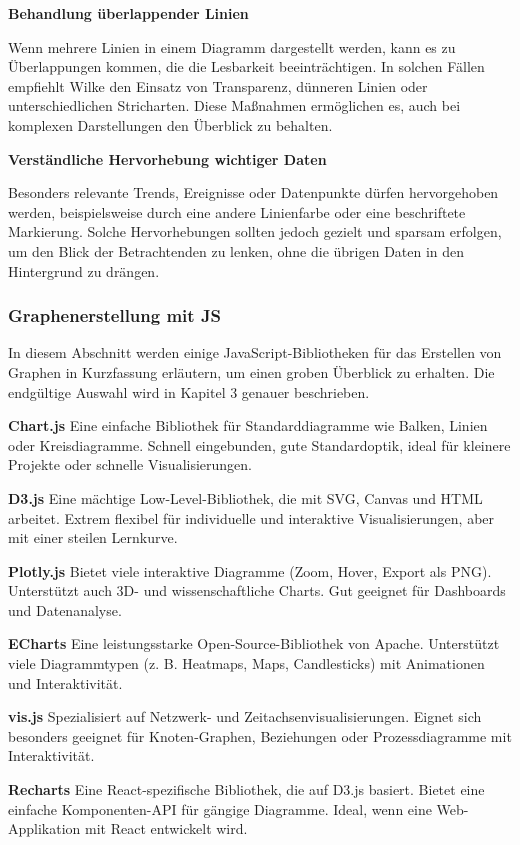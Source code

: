 \item
\textbf{Behandlung überlappender Linien}

Wenn mehrere Linien in einem Diagramm dargestellt werden, kann es zu Überlappungen kommen, die die Lesbarkeit beeinträchtigen.
In solchen Fällen empfiehlt Wilke den Einsatz von Transparenz, dünneren Linien oder unterschiedlichen Stricharten.
Diese Maßnahmen ermöglichen es, auch bei komplexen Darstellungen den Überblick zu behalten.
\item
\textbf{Verständliche Hervorhebung wichtiger Daten}

Besonders relevante Trends, Ereignisse oder Datenpunkte dürfen hervorgehoben werden, beispielsweise durch eine andere Linienfarbe oder eine beschriftete Markierung.
Solche Hervorhebungen sollten jedoch gezielt und sparsam erfolgen, um den Blick der Betrachtenden zu lenken, ohne die übrigen Daten in den Hintergrund zu drängen.

\subsubsection{Graphenerstellung mit JS}

In diesem Abschnitt werden einige JavaScript-Bibliotheken für das Erstellen von Graphen
in Kurzfassung erläutern, um einen groben Überblick zu erhalten.
Die endgültige Auswahl wird in Kapitel 3 genauer beschrieben.

\textbf{Chart.js}
Eine einfache Bibliothek für Standarddiagramme wie Balken, Linien
oder Kreisdiagramme. Schnell eingebunden, gute Standardoptik, ideal für
kleinere Projekte oder schnelle Visualisierungen. \cite{Chartjs2025}

\textbf{D3.js}
Eine mächtige Low-Level-Bibliothek, die mit \ac{SVG}, Canvas und HTML arbeitet.
Extrem flexibel für individuelle und interaktive Visualisierungen, aber mit
einer steilen Lernkurve. \cite{D3js2025}

\textbf{Plotly.js}
Bietet viele interaktive Diagramme (Zoom, Hover, Export als PNG). Unterstützt
auch 3D- und wissenschaftliche Charts. Gut geeignet für Dashboards und
Datenanalyse. \cite{Plotlyjs2025}

\textbf{ECharts}
Eine leistungsstarke Open-Source-Bibliothek von Apache. Unterstützt viele
Diagrammtypen (z. B. Heatmaps, Maps, Candlesticks) mit Animationen und
Interaktivität. \cite{ECharts2025}

\textbf{vis.js}
Spezialisiert auf Netzwerk- und Zeitachsenvisualisierungen. Eignet sich
besonders geeignet für Knoten-Graphen, Beziehungen oder Prozessdiagramme mit Interaktivität. \cite{Visjs2025}

\textbf{Recharts}
Eine React-spezifische Bibliothek, die auf D3.js basiert.
Bietet eine einfache Komponenten-API für gängige Diagramme.
Ideal, wenn eine Web-Applikation mit React entwickelt wird. \cite{Recharts2025}





